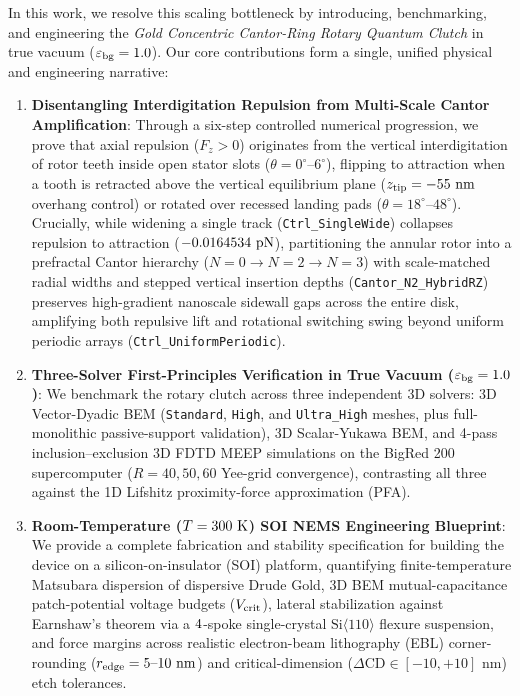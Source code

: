 \documentclass[11pt,letterpaper]{article}
\begin{document}
In this work, we resolve this scaling bottleneck by introducing, benchmarking, and engineering the \emph{Gold Concentric Cantor-Ring Rotary Quantum Clutch} in true vacuum ($\varepsilon_{\rm bg}=1.0$). Our core contributions form a single, unified physical and engineering narrative:
\begin{enumerate}
    \item \textbf{Disentangling Interdigitation Repulsion from Multi-Scale Cantor Amplification}: Through a six-step controlled numerical progression, we prove that axial repulsion ($F_z > 0$) originates from the vertical interdigitation of rotor teeth inside open stator slots ($\theta = 0^\circ\text{--}6^\circ$), flipping to attraction when a tooth is retracted above the vertical equilibrium plane ($z_{\rm tip} = -55\text{ nm}$ overhang control) or rotated over recessed landing pads ($\theta = 18^\circ\text{--}48^\circ$). Crucially, while widening a single track (\texttt{Ctrl\_SingleWide}) collapses repulsion to attraction ($-0.0164534{}\text{ pN}$), partitioning the annular rotor into a prefractal Cantor hierarchy ($N=0 \to N=2 \to N=3$) with scale-matched radial widths and stepped vertical insertion depths (\texttt{Cantor\_N2\_HybridRZ}) preserves high-gradient nanoscale sidewall gaps across the entire disk, amplifying both repulsive lift and rotational switching swing beyond uniform periodic arrays (\texttt{Ctrl\_UniformPeriodic}).
    \item \textbf{Three-Solver First-Principles Verification in True Vacuum ($\varepsilon_{\rm bg}=1.0$)}: We benchmark the rotary clutch across three independent 3D solvers: 3D Vector-Dyadic BEM (\texttt{Standard}, \texttt{High}, and \texttt{Ultra\_High} meshes, plus full-monolithic passive-support validation), 3D Scalar-Yukawa BEM, and 4-pass inclusion--exclusion 3D FDTD MEEP simulations on the BigRed 200 supercomputer ($R=40, 50, 60$ Yee-grid convergence), contrasting all three against the 1D Lifshitz proximity-force approximation (PFA).
    \item \textbf{Room-Temperature ($T = 300{}\text{ K}$) SOI NEMS Engineering Blueprint}: We provide a complete fabrication and stability specification for building the device on a silicon-on-insulator (SOI) platform, quantifying finite-temperature Matsubara dispersion of dispersive Drude Gold, 3D BEM mutual-capacitance patch-potential voltage budgets ($V_{\rm crit}$), lateral stabilization against Earnshaw's theorem via a $4{}$-spoke single-crystal $\text{Si}\langle 110\rangle$ flexure suspension, and force margins across realistic electron-beam lithography (EBL) corner-rounding ($r_{\rm edge}=5\text{--}10\text{ nm}$) and critical-dimension ($\Delta\text{CD} \in [-10, +10]\text{ nm}$) etch tolerances.
\end{enumerate}
\end{document}
